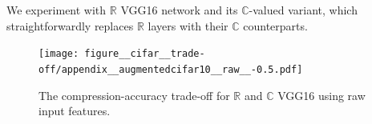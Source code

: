 \documentclass[a4paper]{extarticle}
\newcommand{\real}{\mathbb{R}}
\newcommand{\cplx}{\mathbb{C}}
\begin{document}
We experiment with $\real$ VGG16 network \citep{simonyan_very_2015} and its $\cplx$-valued
variant, which straightforwardly replaces $\real$ layers with their $\cplx$ counterparts.

\begin{figure}[!ht]
  \centering
  \texttt{[image: figure\_\_cifar\_\_trade-off/appendix\_\_augmentedcifar10\_\_raw\_\_-0.5.pdf]}
  \caption{%
    The compression-accuracy trade-off for $\real$ and $\cplx$ VGG16 using raw input features.
  }
  \label{fig:appendix__cifar__trade-off__VGG16__raw}
\end{figure}


\clearpage



\end{document}

